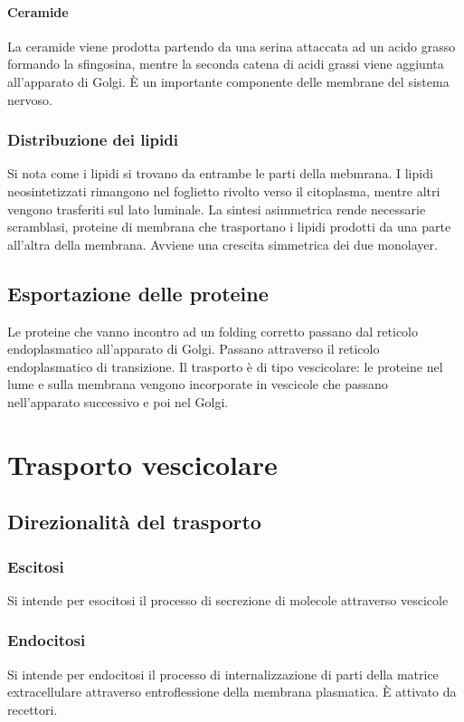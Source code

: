 			\paragraph{Ceramide}
			La ceramide viene prodotta partendo da una serina attaccata ad un acido grasso formando la sfingosina, mentre la seconda catena di acidi grassi viene aggiunta all'apparato di Golgi.
			\`E un importante componente delle membrane del sistema nervoso.

		\subsubsection{Distribuzione dei lipidi}
		Si nota come i lipidi si trovano da entrambe le parti della mebmrana.
		I lipidi neosintetizzati rimangono nel foglietto rivolto verso il citoplasma, mentre altri vengono trasferiti sul lato luminale.
		La sintesi asimmetrica rende necessarie scramblasi, proteine di membrana che trasportano i lipidi prodotti da una parte all'altra della membrana.
		Avviene una crescita simmetrica dei due monolayer.

	\subsection{Esportazione delle proteine}
	Le proteine che vanno incontro ad un folding corretto passano dal reticolo endoplasmatico all'apparato di Golgi.
	Passano attraverso il reticolo endoplasmatico di transizione.
	Il trasporto \`e di tipo vescicolare: le proteine nel lume e sulla membrana vengono incorporate in vescicole che passano nell'apparato successivo e poi nel Golgi.

\section{Trasporto vescicolare}

	\subsection{Direzionalit\`a del trasporto}

		\subsubsection{Escitosi}
		Si intende per esocitosi il processo di secrezione di molecole attraverso vescicole

		\subsubsection{Endocitosi}
		Si intende per endocitosi il processo di internalizzazione di parti della matrice extracellulare attraverso entroflessione della membrana plasmatica.
		\`E attivato da recettori.
	
